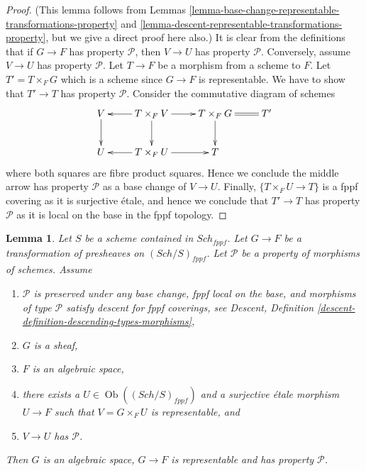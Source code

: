 \documentclass{stacks-project}
\theoremstyle{plain}
\newtheorem{lemma}[subsection]{Lemma}
\theoremstyle{definition}
\theoremstyle{remark}
\numberwithin{equation}{subsection}
\def\Sch{\mathit{Sch}}
\def\Ob{\mathop{\mathrm{Ob}}\nolimits}
\begin{document}
\begin{proof}
(This lemma follows from
Lemmas \ref{lemma-base-change-representable-transformations-property} and
\ref{lemma-descent-representable-transformations-property},
but we give a direct proof here also.)
It is clear from the definitions that if $G \to F$ has property
$\mathcal{P}$, then $V \to U$ has property $\mathcal{P}$.
Conversely, assume $V \to U$ has property $\mathcal{P}$.
Let $T \to F$ be a morphism from a scheme to $F$.
Let $T' = T \times_F G$ which is a scheme since $G \to F$ is
representable. We have to show that $T' \to T$ has property $\mathcal{P}$.
Consider the commutative diagram of schemes
$$
\xymatrix{
V \ar[d] & T \times_F V \ar[d] \ar[l] \ar[r] &
T \times_F G \ar[d] \ar@{=}[r] & T' \\
U & T \times_F U \ar[l] \ar[r] & T
}
$$
where both squares are fibre product squares. Hence we conclude
the middle arrow has property $\mathcal{P}$ as a base change
of $V \to U$. Finally, $\{T \times_F U \to T\}$ is a fppf covering
as it is surjective \'etale, and hence we conclude that
$T' \to T$ has property $\mathcal{P}$ as it is local on the
base in the fppf topology.
\end{proof}

\begin{lemma}
\label{lemma-morphism-sheaves-with-P-effective-descent-etale}
Let $S$ be a scheme contained in $\Sch_{fppf}$.
Let $G \to F$ be a transformation of presheaves on $(\Sch/S)_{fppf}$.
Let $\mathcal{P}$ be a property of morphisms of schemes.
Assume
\begin{enumerate}
\item $\mathcal{P}$ is preserved under any base change, fppf local on the
base, and morphisms of type $\mathcal{P}$ satisfy descent for fppf coverings,
see Descent, Definition \ref{descent-definition-descending-types-morphisms},
\item $G$ is a sheaf,
\item $F$ is an algebraic space,
\item there exists a $U \in \Ob((\Sch/S)_{fppf})$
and a surjective \'etale morphism $U \to F$ such that
$V = G \times_F U$ is representable, and
\item $V \to U$ has $\mathcal{P}$.
\end{enumerate}
Then $G$ is an algebraic space, $G \to F$ is representable and has property
$\mathcal{P}$.
\end{lemma}
\end{document}
